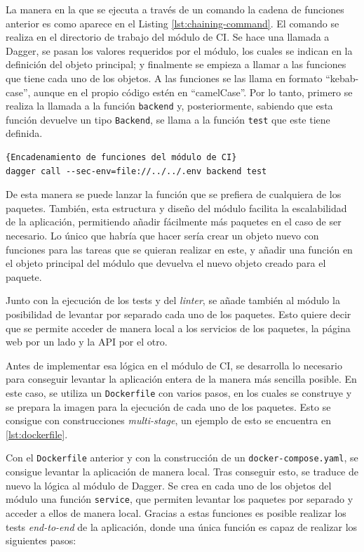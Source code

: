 La manera en la que se ejecuta a través de un comando la cadena de funciones anterior es como aparece en el Listing \ref{lst:chaining-command}. El comando se realiza en el directorio de trabajo del módulo de CI. Se hace una llamada a Dagger, se pasan los valores requeridos por el módulo, los cuales se indican en la definición del objeto principal; y finalmente se empieza a llamar a las funciones que tiene cada uno de los objetos. A las funciones se las llama en formato ``kebab-case'', aunque en el propio código estén en ``camelCase''. Por lo tanto, primero se realiza la llamada a la función \texttt{backend} y, posteriormente, sabiendo que esta función devuelve un tipo \texttt{Backend}, se llama a la función \texttt{test} que este tiene definida.

\begin{lstlisting}[label=lst:chaining-command]{Encadenamiento de funciones del módulo de CI}
dagger call --sec-env=file://../../.env backend test
\end{lstlisting}

De esta manera se puede lanzar la función que se prefiera de cualquiera de los paquetes. También, esta estructura y diseño del módulo facilita la escalabilidad de la aplicación, permitiendo añadir fácilmente más paquetes en el caso de ser necesario. Lo único que habría que hacer sería crear un objeto nuevo con funciones para las tareas que se quieran realizar en este, y añadir una función en el objeto principal del módulo que devuelva el nuevo objeto creado para el paquete.

Junto con la ejecución de los tests y del \textit{linter}, se añade también al módulo la posibilidad de levantar por separado cada uno de los paquetes. Esto quiere decir que se permite acceder de manera local a los servicios de los paquetes, la página web por un lado y la API por el otro.

Antes de implementar esa lógica en el módulo de CI, se desarrolla lo necesario para conseguir levantar la aplicación entera de la manera más sencilla posible. En este caso, se utiliza un \texttt{Dockerfile} con varios pasos, en los cuales se construye y se prepara la imagen para la ejecución de cada uno de los paquetes. Esto se consigue con construcciones \textit{multi-stage}, un ejemplo de esto se encuentra en \ref{lst:dockerfile}.

Con el \texttt{Dockerfile} anterior y con la construcción de un \texttt{docker-compose.yaml}, se consigue levantar la aplicación de manera local. Tras conseguir esto, se traduce de nuevo la lógica al módulo de Dagger. Se crea en cada uno de los objetos del módulo una función \texttt{service}, que permiten levantar los paquetes por separado y acceder a ellos de manera local. Gracias a estas funciones es posible realizar los tests \textit{end-to-end} de la aplicación, donde una única función es capaz de realizar los siguientes pasos:

